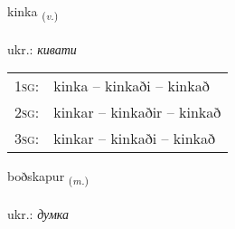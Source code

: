 \documentclass[frontgrid, backgrid]{flacards}\usepackage[]{graphicx}\usepackage[]{xcolor}
\begin{document}
\renewcommand{\flhead}{\vskip5pt \fboxsep=0pt {\small\bfseries\footnotesize Sagnorð | дієслово}}
\renewcommand{\fcfoot}{\vskip5pt \fboxsep=0pt \hspace{2pt}{\small\bfseries\footnotesize 3K}}

\renewcommand{\blhead}{\vskip5pt {\small\bfseries\footnotesize Sagnorð | дієслово }}
\renewcommand{\bcfoot}{\vskip5pt \hspace{2pt}{\small\bfseries\footnotesize 3K}}


{kinka \small{\textsubscript{(\textit{v.})}} \\[1ex] %
\textphonetic{[cʰiŋ̥ka]} \\
ukr.: \emph{кивати} \\  [2ex]
\renewcommand*{\arraystretch}{0.8}
\begin{tabular}{p{1cm}l}
\textsc{1sg}: & kinka -- kinkaði -- kinkað \\ 
\textsc{2sg}: & kinkar -- kinkaðir -- kinkað \\ 
\textsc{3sg}: & kinkar -- kinkaði -- kinkað \\ 
\end{tabular}
}

\renewcommand{\flhead}{\vskip5pt \fboxsep=0pt {\small\bfseries\footnotesize Nafnorð | іменник}}
\renewcommand{\fcfoot}{\vskip5pt \fboxsep=0pt \hspace{2pt}{\small\bfseries\footnotesize 3K}}

\renewcommand{\blhead}{\vskip5pt {\small\bfseries\footnotesize Nafnorð | іменник }}
\renewcommand{\bcfoot}{\vskip5pt \hspace{2pt}{\small\bfseries\footnotesize 3K}}


{boðskapur \small{\textsubscript{(\textit{m.})}} \\[1ex] %
\textphonetic{[pɔðskapʏr]} \\
ukr.: \emph{думка} \\  [2ex]
\renewcommand*{\arraystretch}{0.8}
}
\end{document}
